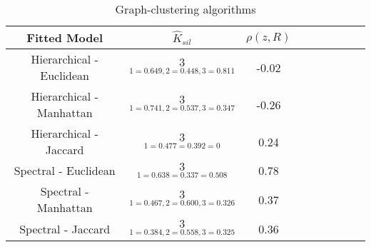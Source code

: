 \documentclass[11pt]{amsart}
\begin{document}
\begin{table}[htbp]
\centering
\caption{
{\large Graph-clustering algorithms} \\ 
{\small }
} 
\begin{tabular}{ccccccccc}
\toprule
\multirow{1}{*}{Fitted Model} &$\hat{K}_{sil}$ & $\rho(\hat{z},R)$  \\
\midrule
Hierarchical  - Euclidean &$\underset{1=0.649, 2= 0.448, 3 = 0.811}{3}$  & -0.02 \\
Hierarchical  - Manhattan  &$\underset{1=0.741,2=0.537,3=0.347}{3}$  &-0.26 \\
Hierarchical  - Jaccard  &$\underset{1=0.477=0.392=0}{3}$  & 0.24 \\
Spectral  - Euclidean  &$\underset{1=0.638=0.337=0.508}{3}$  & 0.78 &\\
Spectral  - Manhattan  &$\underset{1=0.467, 2= 0.600, 3 = 0.326}{3}$ & 0.37    \\
Spectral  - Jaccard  &$\underset{1=0.384, 2= 0.558, 3 = 0.325}{3}$ & 0.36    \\
\bottomrule
\end{tabular}
\label{table:simulations_from_simple}
\end{table}
\end{document}
